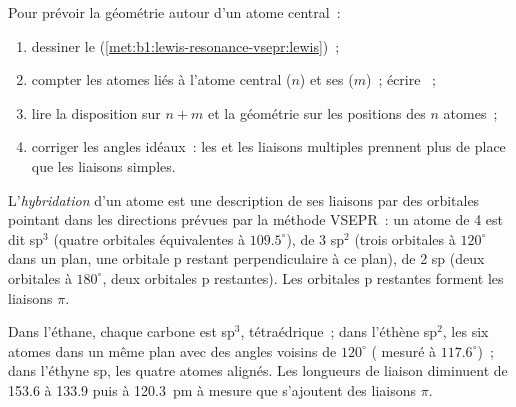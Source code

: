 \begin{method}\label{met:b1:lewis-resonance-vsepr:vsepr}
Pour prévoir la géométrie autour d'un atome central~:
\begin{enumerate}
  \item dessiner le  (\cref{met:b1:lewis-resonance-vsepr:lewis})~;
  \item compter les atomes liés à l'atome central ($n$) et ses  ($m$)~; écrire ~;
  \item lire la disposition sur $n + m$ et la géométrie sur les positions
        des $n$ atomes~;
  \item corriger les angles idéaux~: les  et les
        liaisons multiples prennent plus de place que les liaisons simples.
\end{enumerate}
\end{method}

\begin{definition}[Hybridation]\label{def:b1:lewis-resonance-vsepr:hybridisation}
L'\emph{hybridation} d'un atome est une description de
ses liaisons par des orbitales pointant dans les directions prévues par
la méthode VSEPR~: un atome de  4 est dit sp$^3$ (quatre
orbitales équivalentes à $109.5^\circ$), de  3 sp$^2$
(trois orbitales à $120^\circ$ dans un plan, une orbitale p restant
perpendiculaire à ce plan), de  2 sp (deux orbitales à
$180^\circ$, deux orbitales p restantes). Les orbitales p restantes
forment les liaisons $\pi$.
\end{definition}

\begin{example}\label{ex:b1:lewis-resonance-vsepr:carbon}
Dans l'éthane, chaque carbone est sp$^3$, tétraédrique~; dans l'éthène
sp$^2$, les six atomes dans un même plan avec des angles voisins de
$120^\circ$ ( mesuré à $117.6^\circ$)~; dans l'éthyne sp, les
quatre atomes alignés. Les longueurs de liaison diminuent de 153.6 à
133.9 puis à \qty{120.3}{pm} à mesure que s'ajoutent des liaisons $\pi$.
\end{example}

